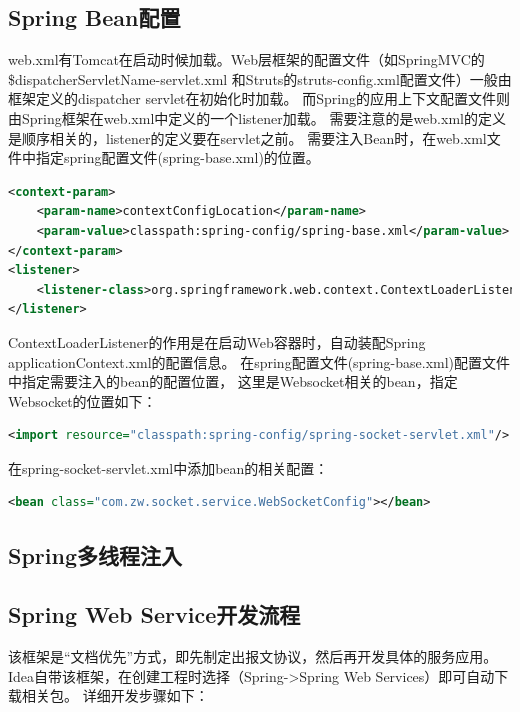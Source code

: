 \documentclass{book}
\begin{document}
\subsection{Spring Bean配置}

web.xml有Tomcat在启动时候加载。Web层框架的配置文件（如SpringMVC的\${dispatcherServletName}-servlet.xml
和Struts的struts-config.xml配置文件）一般由框架定义的dispatcher servlet在初始化时加载。
而Spring的应用上下文配置文件则由Spring框架在web.xml中定义的一个listener加载。
需要注意的是web.xml的定义是顺序相关的，listener的定义要在servlet之前。
需要注入Bean时，在web.xml文件中指定spring配置文件(spring-base.xml)的位置。

\begin{lstlisting}[language=XML]
<context-param>
	<param-name>contextConfigLocation</param-name>
	<param-value>classpath:spring-config/spring-base.xml</param-value>
</context-param>
<listener>
	<listener-class>org.springframework.web.context.ContextLoaderListener</listener-class>
</listener>
\end{lstlisting}

ContextLoaderListener的作用是在启动Web容器时，自动装配Spring applicationContext.xml的配置信息。
在spring配置文件(spring-base.xml)配置文件中指定需要注入的bean的配置位置，
这里是Websocket相关的bean，指定Websocket的位置如下：

\begin{lstlisting}[language=XML]
<import resource="classpath:spring-config/spring-socket-servlet.xml"/>
\end{lstlisting}

在spring-socket-servlet.xml中添加bean的相关配置：

\begin{lstlisting}[language=XML]
<bean class="com.zw.socket.service.WebSocketConfig"></bean>
\end{lstlisting}

\subsection{Spring多线程注入}



\subsection{Spring Web Service开发流程}

该框架是“文档优先”方式，即先制定出报文协议，然后再开发具体的服务应用。
Idea自带该框架，在创建工程时选择（Spring->Spring Web Services）即可自动下载相关包。
详细开发步骤如下：
\end{document}
